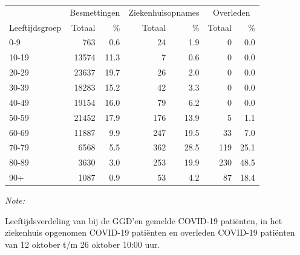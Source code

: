 \documentclass[
  english,
  man,floatsintext]{apa6}
\begin{document}
\begin{table}[H]
\centering\begingroup\fontsize{11}{13}\selectfont

\begin{threeparttable}
\begin{tabular}{lrrrrrr}
\toprule
\multicolumn{1}{c}{ } & \multicolumn{2}{c}{Besmettingen} & \multicolumn{2}{c}{Ziekenhuisopnames} & \multicolumn{2}{c}{Overleden} \\
\cmidrule(l{3pt}r{3pt}){2-3} \cmidrule(l{3pt}r{3pt}){4-5} \cmidrule(l{3pt}r{3pt}){6-7}
Leeftijdsgroep & Totaal & \% & Totaal & \% & Totaal & \%\\
\midrule
0-9 & 763 & 0.6 & 24 & 1.9 & 0 & 0.0\\
10-19 & 13574 & 11.3 & 7 & 0.6 & 0 & 0.0\\
20-29 & 23637 & 19.7 & 26 & 2.0 & 0 & 0.0\\
30-39 & 18283 & 15.2 & 42 & 3.3 & 0 & 0.0\\
40-49 & 19154 & 16.0 & 79 & 6.2 & 0 & 0.0\\
50-59 & 21452 & 17.9 & 176 & 13.9 & 5 & 1.1\\
60-69 & 11887 & 9.9 & 247 & 19.5 & 33 & 7.0\\
70-79 & 6568 & 5.5 & 362 & 28.5 & 119 & 25.1\\
80-89 & 3630 & 3.0 & 253 & 19.9 & 230 & 48.5\\
90+ & 1087 & 0.9 & 53 & 4.2 & 87 & 18.4\\
\bottomrule
\end{tabular}
\begin{tablenotes}
\item \textit{Note: } 
\item Leeftijdsverdeling van bij de GGD’en gemelde COVID-19 patiënten, in het ziekenhuis opgenomen COVID-19 patiënten en overleden COVID-19 patiënten van 12 oktober t/m 26 oktober 10:00 uur.
\end{tablenotes}
\end{threeparttable}
\endgroup{}
\end{table}
\end{document}

